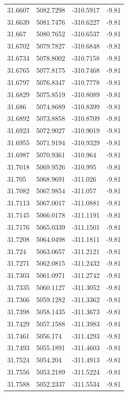 \begin{table}[H]
\begin{tabular}{llll}
31.6607 & 5082.7298 & -310.5917 & -9.81 \\
31.6639 & 5081.7476 & -310.6227 & -9.81 \\
31.667 & 5080.7652 & -310.6537 & -9.81 \\
31.6702 & 5079.7827 & -310.6848 & -9.81 \\
31.6734 & 5078.8002 & -310.7158 & -9.81 \\
31.6765 & 5077.8175 & -310.7468 & -9.81 \\
31.6797 & 5076.8347 & -310.7778 & -9.81 \\
31.6829 & 5075.8519 & -310.8089 & -9.81 \\
31.686 & 5074.8689 & -310.8399 & -9.81 \\
31.6892 & 5073.8858 & -310.8709 & -9.81 \\
31.6923 & 5072.9027 & -310.9019 & -9.81 \\
31.6955 & 5071.9194 & -310.9329 & -9.81 \\
31.6987 & 5070.9361 & -310.964 & -9.81 \\
31.7018 & 5069.9526 & -310.995 & -9.81 \\
31.705 & 5068.9691 & -311.026 & -9.81 \\
31.7082 & 5067.9854 & -311.057 & -9.81 \\
31.7113 & 5067.0017 & -311.0881 & -9.81 \\
31.7145 & 5066.0178 & -311.1191 & -9.81 \\
31.7176 & 5065.0339 & -311.1501 & -9.81 \\
31.7208 & 5064.0498 & -311.1811 & -9.81 \\
31.724 & 5063.0657 & -311.2121 & -9.81 \\
31.7271 & 5062.0815 & -311.2432 & -9.81 \\
31.7303 & 5061.0971 & -311.2742 & -9.81 \\
31.7335 & 5060.1127 & -311.3052 & -9.81 \\
31.7366 & 5059.1282 & -311.3362 & -9.81 \\
31.7398 & 5058.1435 & -311.3673 & -9.81 \\
31.7429 & 5057.1588 & -311.3983 & -9.81 \\
31.7461 & 5056.174 & -311.4293 & -9.81 \\
31.7493 & 5055.1891 & -311.4603 & -9.81 \\
31.7524 & 5054.204 & -311.4913 & -9.81 \\
31.7556 & 5053.2189 & -311.5224 & -9.81 \\
31.7588 & 5052.2337 & -311.5534 & -9.81 \\

\end{tabular}
\end{table}
